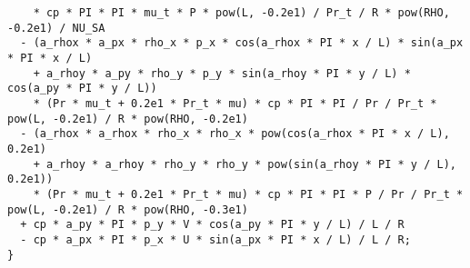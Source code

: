 \documentclass[10pt]{article}
\begin{document}
\begin{footnotesize}
\begin{verbatim}
    * cp * PI * PI * mu_t * P * pow(L, -0.2e1) / Pr_t / R * pow(RHO, -0.2e1) / NU_SA
  - (a_rhox * a_px * rho_x * p_x * cos(a_rhox * PI * x / L) * sin(a_px * PI * x / L)
    + a_rhoy * a_py * rho_y * p_y * sin(a_rhoy * PI * y / L) * cos(a_py * PI * y / L))
    * (Pr * mu_t + 0.2e1 * Pr_t * mu) * cp * PI * PI / Pr / Pr_t * pow(L, -0.2e1) / R * pow(RHO, -0.2e1)
  - (a_rhox * a_rhox * rho_x * rho_x * pow(cos(a_rhox * PI * x / L), 0.2e1)
    + a_rhoy * a_rhoy * rho_y * rho_y * pow(sin(a_rhoy * PI * y / L), 0.2e1))
    * (Pr * mu_t + 0.2e1 * Pr_t * mu) * cp * PI * PI * P / Pr / Pr_t * pow(L, -0.2e1) / R * pow(RHO, -0.3e1)
  + cp * a_py * PI * p_y * V * cos(a_py * PI * y / L) / L / R
  - cp * a_px * PI * p_x * U * sin(a_px * PI * x / L) / L / R;
}
\end{verbatim}

\end{footnotesize}

 

\end{document}
